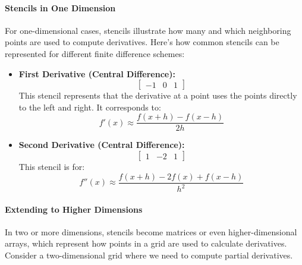 \documentclass[11pt,a4paper]{article}
\theoremstyle{plain}
\theoremstyle{definition}
\theoremstyle{remark}
\begin{document}
\paragraph*{Stencils in One Dimension}

For one-dimensional cases, stencils illustrate how many and which neighboring points are used to compute derivatives. Here's how common stencils can be represented for different finite difference schemes:

\begin{itemize}
    \item \textbf{First Derivative (Central Difference):}
    \[
    \begin{bmatrix}
    -1 & 0 & 1
    \end{bmatrix}
    \]
    This stencil represents that the derivative at a point uses the points directly to the left and right. It corresponds to:
    \[
    f'(x) \approx \frac{f(x+h) - f(x-h)}{2h}
    \]

    \item \textbf{Second Derivative (Central Difference):}
    \[
    \begin{bmatrix}
    1 & -2 & 1
    \end{bmatrix}
    \]
    This stencil is for:
    \[
    f''(x) \approx \frac{f(x+h) - 2f(x) + f(x-h)}{h^2}
    \]
\end{itemize}

\paragraph*{Extending to Higher Dimensions}

In two or more dimensions, stencils become matrices or even higher-dimensional arrays, which represent how points in a grid are used to calculate derivatives. Consider a two-dimensional grid where we need to compute partial derivatives.
\end{document}
